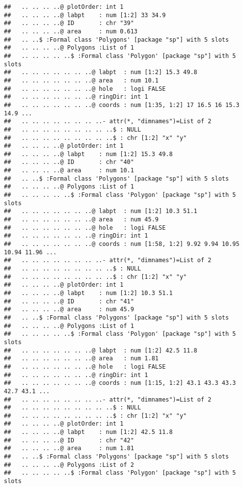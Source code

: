 \documentclass[]{article}
\begin{document}
\begin{verbatim}
##   .. .. .. ..@ plotOrder: int 1
##   .. .. .. ..@ labpt    : num [1:2] 33 34.9
##   .. .. .. ..@ ID       : chr "39"
##   .. .. .. ..@ area     : num 0.613
##   .. ..$ :Formal class 'Polygons' [package "sp"] with 5 slots
##   .. .. .. ..@ Polygons :List of 1
##   .. .. .. .. ..$ :Formal class 'Polygon' [package "sp"] with 5 slots
##   .. .. .. .. .. .. ..@ labpt  : num [1:2] 15.3 49.8
##   .. .. .. .. .. .. ..@ area   : num 10.1
##   .. .. .. .. .. .. ..@ hole   : logi FALSE
##   .. .. .. .. .. .. ..@ ringDir: int 1
##   .. .. .. .. .. .. ..@ coords : num [1:35, 1:2] 17 16.5 16 15.3 14.9 ...
##   .. .. .. .. .. .. .. ..- attr(*, "dimnames")=List of 2
##   .. .. .. .. .. .. .. .. ..$ : NULL
##   .. .. .. .. .. .. .. .. ..$ : chr [1:2] "x" "y"
##   .. .. .. ..@ plotOrder: int 1
##   .. .. .. ..@ labpt    : num [1:2] 15.3 49.8
##   .. .. .. ..@ ID       : chr "40"
##   .. .. .. ..@ area     : num 10.1
##   .. ..$ :Formal class 'Polygons' [package "sp"] with 5 slots
##   .. .. .. ..@ Polygons :List of 1
##   .. .. .. .. ..$ :Formal class 'Polygon' [package "sp"] with 5 slots
##   .. .. .. .. .. .. ..@ labpt  : num [1:2] 10.3 51.1
##   .. .. .. .. .. .. ..@ area   : num 45.9
##   .. .. .. .. .. .. ..@ hole   : logi FALSE
##   .. .. .. .. .. .. ..@ ringDir: int 1
##   .. .. .. .. .. .. ..@ coords : num [1:58, 1:2] 9.92 9.94 10.95 10.94 11.96 ...
##   .. .. .. .. .. .. .. ..- attr(*, "dimnames")=List of 2
##   .. .. .. .. .. .. .. .. ..$ : NULL
##   .. .. .. .. .. .. .. .. ..$ : chr [1:2] "x" "y"
##   .. .. .. ..@ plotOrder: int 1
##   .. .. .. ..@ labpt    : num [1:2] 10.3 51.1
##   .. .. .. ..@ ID       : chr "41"
##   .. .. .. ..@ area     : num 45.9
##   .. ..$ :Formal class 'Polygons' [package "sp"] with 5 slots
##   .. .. .. ..@ Polygons :List of 1
##   .. .. .. .. ..$ :Formal class 'Polygon' [package "sp"] with 5 slots
##   .. .. .. .. .. .. ..@ labpt  : num [1:2] 42.5 11.8
##   .. .. .. .. .. .. ..@ area   : num 1.81
##   .. .. .. .. .. .. ..@ hole   : logi FALSE
##   .. .. .. .. .. .. ..@ ringDir: int 1
##   .. .. .. .. .. .. ..@ coords : num [1:15, 1:2] 43.1 43.3 43.3 42.7 43.1 ...
##   .. .. .. .. .. .. .. ..- attr(*, "dimnames")=List of 2
##   .. .. .. .. .. .. .. .. ..$ : NULL
##   .. .. .. .. .. .. .. .. ..$ : chr [1:2] "x" "y"
##   .. .. .. ..@ plotOrder: int 1
##   .. .. .. ..@ labpt    : num [1:2] 42.5 11.8
##   .. .. .. ..@ ID       : chr "42"
##   .. .. .. ..@ area     : num 1.81
##   .. ..$ :Formal class 'Polygons' [package "sp"] with 5 slots
##   .. .. .. ..@ Polygons :List of 2
##   .. .. .. .. ..$ :Formal class 'Polygon' [package "sp"] with 5 slots

\end{verbatim}
\end{document}
